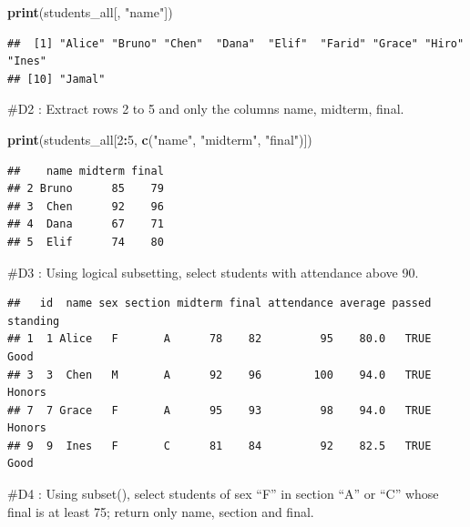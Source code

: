 \documentclass[
]{article}
\newenvironment{Shaded}{\begin{snugshade}}{\end{snugshade}}
\newcommand{\DecValTok}[1]{\textcolor[rgb]{0.00,0.00,0.81}{#1}}
\newcommand{\FunctionTok}[1]{\textcolor[rgb]{0.13,0.29,0.53}{\textbf{#1}}}
\newcommand{\NormalTok}[1]{#1}
\newcommand{\SpecialCharTok}[1]{\textcolor[rgb]{0.81,0.36,0.00}{\textbf{#1}}}
\newcommand{\StringTok}[1]{\textcolor[rgb]{0.31,0.60,0.02}{#1}}
\begin{document}
\begin{Shaded}
\begin{Highlighting}[]
\FunctionTok{print}\NormalTok{(students\_all[, }\StringTok{"name"}\NormalTok{])}
\end{Highlighting}
\end{Shaded}

\begin{verbatim}
##  [1] "Alice" "Bruno" "Chen"  "Dana"  "Elif"  "Farid" "Grace" "Hiro"  "Ines" 
## [10] "Jamal"
\end{verbatim}

\#D2 : Extract rows 2 to 5 and only the columns name, midterm, final.

\begin{Shaded}
\begin{Highlighting}[]
\FunctionTok{print}\NormalTok{(students\_all[}\DecValTok{2}\SpecialCharTok{:}\DecValTok{5}\NormalTok{, }\FunctionTok{c}\NormalTok{(}\StringTok{"name"}\NormalTok{, }\StringTok{"midterm"}\NormalTok{, }\StringTok{"final"}\NormalTok{)])}
\end{Highlighting}
\end{Shaded}

\begin{verbatim}
##    name midterm final
## 2 Bruno      85    79
## 3  Chen      92    96
## 4  Dana      67    71
## 5  Elif      74    80
\end{verbatim}

\#D3 : Using logical subsetting, select students with attendance above
90.

\begin{Shaded}
\end{Shaded}

\begin{verbatim}
##   id  name sex section midterm final attendance average passed standing
## 1  1 Alice   F       A      78    82         95    80.0   TRUE     Good
## 3  3  Chen   M       A      92    96        100    94.0   TRUE   Honors
## 7  7 Grace   F       A      95    93         98    94.0   TRUE   Honors
## 9  9  Ines   F       C      81    84         92    82.5   TRUE     Good
\end{verbatim}

\#D4 : Using subset(), select students of sex ``F'' in section ``A'' or
``C'' whose final is at least 75; return only name, section and final.
\end{document}
